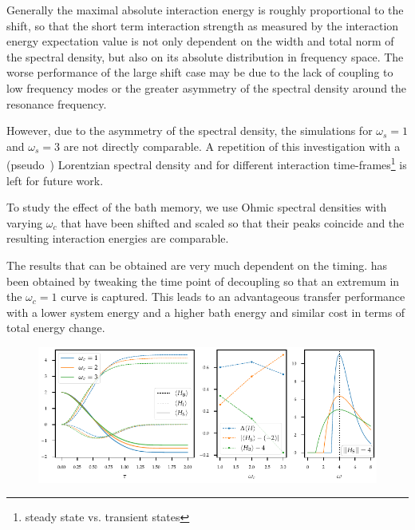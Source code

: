Generally the maximal absolute interaction energy is roughly
proportional to the shift, so that the short term interaction
strength as measured by the interaction energy expectation value is
not only dependent on the width and total norm of the spectral
density, but also on its absolute distribution in frequency space. The
worse performance of the large shift case may be due to the lack of
coupling to low frequency modes or the greater asymmetry of the spectral density around
the resonance frequency.

However, due to the asymmetry of the spectral
density, the simulations for \(ω_s=1\) and \(ω_s=3\) are not directly
comparable. A repetition of this investigation with a
(pseudo~\cite{Mukherjee2020Jan}) Lorentzian spectral density and for
different interaction time-frames\footnote{steady state vs. transient
  states} is left for future work.

To study the effect of the bath memory, we use Ohmic spectral
densities with varying \(ω_c\) that have been shifted and scaled so
that their peaks coincide and the resulting interaction energies are
comparable.

The results that can be obtained are very much dependent on the
timing.  has been obtained by tweaking the
time point of decoupling so that an extremum in the \(ω_{c}=1\) curve
is captured. This leads to an advantageous transfer performance with a
lower system energy and a higher bath energy and similar cost in terms
of total energy change.
\begin{figure}[h]
  \centering
  \includegraphics{figs/one_bath_syst/markov_analysis}
  \caption{\label{fig:markov_analysis}}
\end{figure}

